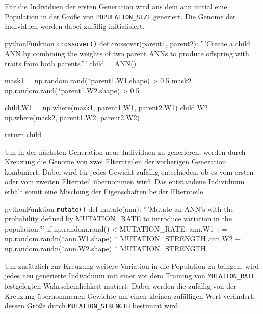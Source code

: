 Für die Individuen der ersten Generation wird aus dem \Gls{ann} initial eine Population in der Größe von \texttt{POPULATION\_SIZE} generiert. Die Genome der Individuen werden dabei zufällig initialisiert.

\begin{snippet}[h]
    \centering
    \begin{codebox}{python}{Funktion \texttt{crossover()}}
        def crossover(parent1, parent2):
            '''Create a child ANN by combining the weights of two parent ANNs to produce offspring with traits from both parents.'''
            child = ANN()

            mask1 = np.random.rand(*parent1.W1.shape) > 0.5
            mask2 = np.random.rand(*parent1.W2.shape) > 0.5

            child.W1 = np.where(mask1, parent1.W1, parent2.W1)
            child.W2 = np.where(mask2, parent1.W2, parent2.W2)

            return child
    \end{codebox}
    \caption{Implementierung der Funktion \texttt{crossover()}}
    \label{snippet:03-03_crossover-function}
\end{snippet}

Um in der nächsten Generation neue Individuen zu generieren, werden durch Kreuzung die Genome von zwei Elternteilen der vorherigen Generation kombiniert. Dabei wird für jedes Gewicht zufällig entschieden, ob es vom ersten oder vom zweiten Elternteil übernommen wird. Das entstandene Individuum erhält somit eine Mischung der Eigenschaften beider Elternteile.

\begin{snippet}[h]
    \centering
    \begin{codebox}{python}{Funktion \texttt{mutate()}}
        def mutate(ann):
            '''Mutate an ANN's with the probability defined by MUTATION_RATE to introduce variation in the population.'''
            if np.random.rand() < MUTATION_RATE:
                ann.W1 += np.random.randn(*ann.W1.shape) * MUTATION_STRENGTH
                ann.W2 += np.random.randn(*ann.W2.shape) * MUTATION_STRENGTH
    \end{codebox}
    \caption{Implementierung der Funktion \texttt{mutate()}}
    \label{snippet:03-03_mutate-function}
\end{snippet}

Um zusätzlich zur Kreuzung weitere Variation in die Population zu bringen, wird jedes neu generierte Individuum mit einer vor dem Training von \texttt{MUTATION\_RATE} festgelegten Wahrscheinlichkeit mutiert. Dabei werden die zufällig von der Kreuzung übernommenen Gewichte um einen kleinen zufälligen Wert verändert, dessen Größe durch \texttt{MUTATION\_STRENGTH} bestimmt wird.

